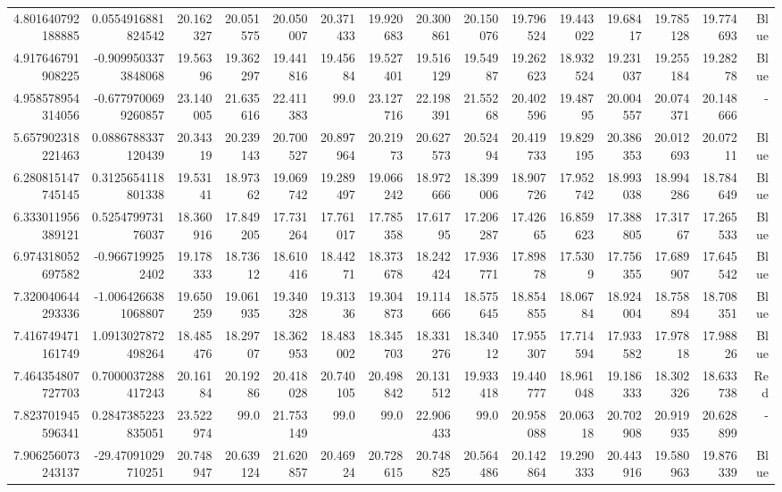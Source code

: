 \begin{center}
\begin{longtable}{rrrrrrrrrrrrrrr}
4.801640792188885 & 0.0554916881824542 & 20.162327 & 20.051575 & 20.050007 & 20.371433 & 19.920683 & 20.300861 & 20.150076 & 19.796524 & 19.443022 & 19.68417 & 19.785128 & 19.774693 & Blue \\
4.917646791908225 & -0.9099503373848068 & 19.56396 & 19.362297 & 19.441816 & 19.45684 & 19.527401 & 19.516129 & 19.54987 & 19.262623 & 18.932524 & 19.231037 & 19.255184 & 19.28278 & Blue \\
4.958578954314056 & -0.6779700699260857 & 23.140005 & 21.635616 & 22.411383 & 99.0 & 23.127716 & 22.198391 & 21.55268 & 20.402596 & 19.48795 & 20.004557 & 20.074371 & 20.148666 & - \\
5.657902318221463 & 0.0886788337120439 & 20.34319 & 20.239143 & 20.700527 & 20.897964 & 20.21973 & 20.627573 & 20.52494 & 20.419733 & 19.829195 & 20.386353 & 20.012693 & 20.07211 & Blue \\
6.280815147745145 & 0.3125654118801338 & 19.53141 & 18.97362 & 19.069742 & 19.289497 & 19.066242 & 18.972666 & 18.399006 & 18.907726 & 17.952742 & 18.993038 & 18.994286 & 18.784649 & Blue \\
6.333011956389121 & 0.525479973176037 & 18.360916 & 17.849205 & 17.731264 & 17.761017 & 17.785358 & 17.61795 & 17.206287 & 17.42665 & 16.859623 & 17.388805 & 17.31767 & 17.265533 & Blue \\
6.974318052697582 & -0.9667199252402 & 19.178333 & 18.73612 & 18.610416 & 18.44271 & 18.373678 & 18.242424 & 17.936771 & 17.89878 & 17.5309 & 17.756355 & 17.689907 & 17.645542 & Blue \\
7.320040644293336 & -1.0064266381068807 & 19.650259 & 19.061935 & 19.340328 & 19.31336 & 19.304873 & 19.114666 & 18.575645 & 18.854855 & 18.06784 & 18.924004 & 18.758894 & 18.708351 & Blue \\
7.416749471161749 & 1.0913027872498264 & 18.485476 & 18.29707 & 18.362953 & 18.483002 & 18.345703 & 18.331276 & 18.34012 & 17.955307 & 17.714594 & 17.933582 & 17.97818 & 17.98826 & Blue \\
7.464354807727703 & 0.7000037288417243 & 20.16184 & 20.19286 & 20.418028 & 20.740105 & 20.498842 & 20.131512 & 19.933418 & 19.440777 & 18.961048 & 19.186333 & 18.302326 & 18.633738 & Red \\
7.823701945596341 & 0.2847385223835051 & 23.522974 & 99.0 & 21.753149 & 99.0 & 99.0 & 22.906433 & 99.0 & 20.958088 & 20.06318 & 20.702908 & 20.919935 & 20.628899 & - \\
7.906256073243137 & -29.47091029710251 & 20.748947 & 20.639124 & 21.620857 & 20.46924 & 20.728615 & 20.748825 & 20.564486 & 20.142864 & 19.290333 & 20.443916 & 19.580963 & 19.876339 & Blue \\

\end{longtable}
\end{center}
